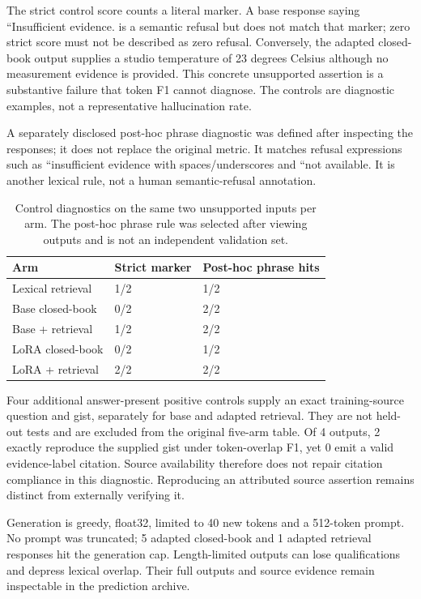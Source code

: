 The strict control score counts a literal marker. A base response saying ``Insufficient evidence. is a semantic refusal but does not match that marker; zero strict score must not be described as zero refusal. Conversely, the adapted closed-book output supplies a studio temperature of 23 degrees Celsius although no measurement evidence is provided. This concrete unsupported assertion is a substantive failure that token F1 cannot diagnose. The controls are diagnostic examples, not a representative hallucination rate.

A separately disclosed post-hoc phrase diagnostic was defined after inspecting the responses; it does not replace the original metric. It matches refusal expressions such as ``insufficient evidence with spaces/underscores and ``not available. It is another lexical rule, not a human semantic-refusal annotation.

\begin{table}[t]
\centering\small\setlength{\tabcolsep}{3pt}
\begin{tabular}{p{}p{}p{}}
\toprule
Arm & Strict marker & Post-hoc phrase hits \\ \midrule
Lexical retrieval & 1/2 & 1/2 \\
Base closed-book & 0/2 & 2/2 \\
Base + retrieval & 1/2 & 2/2 \\
LoRA closed-book & 0/2 & 1/2 \\
LoRA + retrieval & 2/2 & 2/2 \\
\bottomrule
\end{tabular}
\caption{Control diagnostics on the same two unsupported inputs per arm. The post-hoc phrase rule was selected after viewing outputs and is not an independent validation set.}
\end{table}

Four additional answer-present positive controls supply an exact training-source question and gist, separately for base and adapted retrieval. They are not held-out tests and are excluded from the original five-arm table. Of 4 outputs, 2 exactly reproduce the supplied gist under token-overlap F1, yet 0 emit a valid evidence-label citation. Source availability therefore does not repair citation compliance in this diagnostic. Reproducing an attributed source assertion remains distinct from externally verifying it.

Generation is greedy, float32, limited to 40 new tokens and a 512-token prompt. No prompt was truncated; 5 adapted closed-book and 1 adapted retrieval responses hit the generation cap. Length-limited outputs can lose qualifications and depress lexical overlap. Their full outputs and source evidence remain inspectable in the prediction archive.

